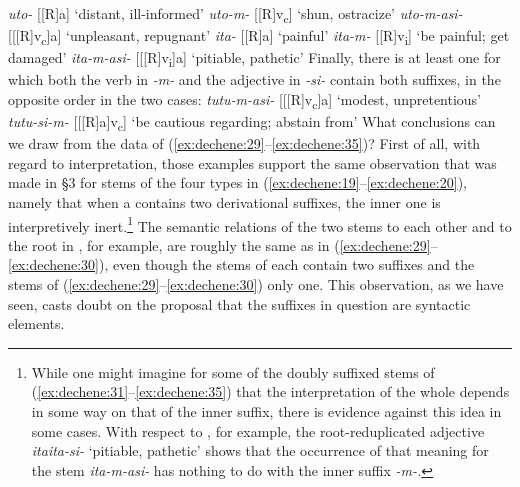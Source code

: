 \documentclass[output=paper,
modfonts
]{LSP/langsci}
\begin{document}
\ea \label{ex:dechene:33}
	\ea \label{ex:dechene:33a} \textit{uto-} {[}{[}R{]}a{]} `distant, ill-informed'
	\ex \label{ex:dechene:33b} \textit{uto-m-} {[}{[}R{]}v\textsubscript{c}{]} `shun, ostracize'
	\ex \label{ex:dechene:33c} \textit{uto-m-asi-} {[}{[}{[}R{]}v\textsubscript{c}{]}a{]} `unpleasant, repugnant'
	\z
\ex \label{ex:dechene:34} 
	\ea \label{ex:dechene:34a} \textit{ita-} {[}{[}R{]}a{]} `painful'
	\ex \label{ex:dechene:34b} \textit{ita-m-} {[}{[}R{]}v\textsubscript{i}{]} `be painful; get damaged'
	\ex \label{ex:dechene:34c} \textit{ita-m-asi-} {[}{[}{[}R{]}v\textsubscript{i}{]}a{]} `pitiable, pathetic'
	\z
\z
Finally, there is at least one  for which both the verb  in
\textit{-m-} and the adjective  in \textit{-si-} contain both suffixes,
in the opposite order in the two cases:
\ea \label{ex:dechene:35}
	\ea \label{ex:dechene:35a} \textit{tutu-m-asi-} {[}{[}{[}R{]}v\textsubscript{c}{]}a{]} `modest, unpretentious'
	\ex \label{ex:dechene:35b} \textit{tutu-si-m-} {[}{[}{[}R{]}a{]}v\textsubscript{c}{]} `be cautious regarding; abstain from'
	\z
\z
What conclusions can we draw from the data of (\ref{ex:dechene:29}--\ref{ex:dechene:35})? First of all,
with regard to interpretation, those examples support the same
observation that was made in \S3 for stems of the four types in
(\ref{ex:dechene:19}--\ref{ex:dechene:20}), namely that when a  contains two derivational suffixes,
the inner one is interpretively inert.\footnote{While one might imagine
  for some of the doubly suffixed stems of (\ref{ex:dechene:31}--\ref{ex:dechene:35}) that the
  interpretation of the whole depends in some way on that of the inner
  suffix, there is evidence against this idea in some cases. With
  respect to , for example, the root-reduplicated adjective
  \textit{itaita-si-} `pitiable, pathetic' shows that the occurrence of
  that meaning for the stem \textit{ita-m-asi-} has nothing to do with the
  inner suffix \textit{-m-.}} The semantic relations of the two stems to
each other and to the root in , for example, are roughly the same as
in (\ref{ex:dechene:29}--\ref{ex:dechene:30}), even though the stems of  each contain two suffixes
and the stems of (\ref{ex:dechene:29}--\ref{ex:dechene:30}) only one. This observation, as we have seen,
casts doubt on the proposal that the suffixes in question are syntactic
elements.
\end{document}
